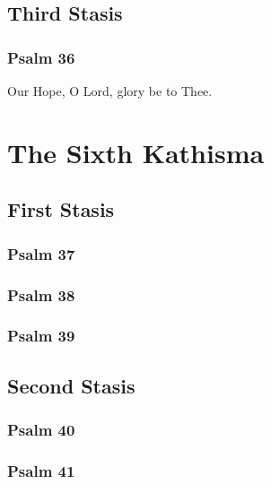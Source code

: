 \documentclass[12pt]{book}
\newcommand{\kathismabreak}{
  \medskip
  \begin{center}
  \begin{footnotesize}
  

  

  

  
  \end{footnotesize}
  \end{center}
  \smallbreak
}
\newcommand{\kathismaend}{
  \medskip
  \begin{center}
  \begin{footnotesize}
  

  

  Our Hope, O Lord, glory be to Thee.
  \end{footnotesize}
  \end{center}
  \smallbreak
}
\begin{document}
\pagebreak %
\kathismabreak

\subsection{Third Stasis}

\subsubsection{Psalm 36}


\kathismaend

\section{The Sixth Kathisma}

\subsection{First Stasis}

\subsubsection{Psalm 37}


\subsubsection{Psalm 38}


\subsubsection{Psalm 39}


\kathismabreak

\pagebreak %
\subsection{Second Stasis}

\subsubsection{Psalm 40}


\subsubsection{Psalm 41}

\end{document}
